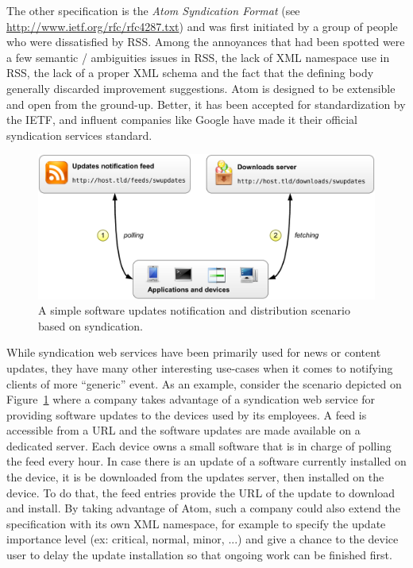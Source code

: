 The other specification is the \emph{Atom Syndication Format} (see \url{http://www.ietf.org/rfc/rfc4287.txt}) and was first initiated by a group of people who were dissatisfied by RSS. Among the annoyances that had been spotted were a few semantic / ambiguities issues in RSS, the lack of XML namespace use in RSS, the lack of a proper XML schema and the fact that the defining body generally discarded improvement suggestions. Atom is designed to be extensible and open from the ground-up. Better, it has been accepted for standardization by the IETF, and influent companies like Google have made it their official syndication services standard.\\

\begin{figure}[htbp]
    \centering
    \includegraphics[width=\textwidth]{content/web-services/syndication-scenario}
    \caption{A simple software updates notification and distribution scenario based on syndication.} 
    \label{fig:syndication-scenario}
\end{figure}

While syndication web services have been primarily used for news or content updates, they have many other interesting use-cases when it comes to notifying clients of more ``generic'' event. As an example, consider the scenario depicted on Figure~\ref{fig:syndication-scenario} where a company takes advantage of a syndication web service for providing software updates to the devices used by its employees. A feed is accessible from a URL and the software updates are made available on a dedicated server. Each device owns a small software that is in charge of polling the feed every hour. In case there is an update of a software currently installed on the device, it is be downloaded from the updates server, then installed on the device. To do that, the feed entries provide the URL of the update to download and install. By taking advantage of Atom, such a company could also extend the specification with its own XML namespace, for example to specify the update importance level (ex: critical, normal, minor, ...) and give a chance to the device user to delay the update installation so that ongoing work can be finished first.\\

